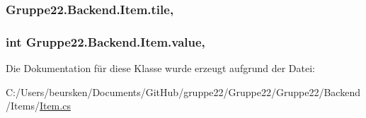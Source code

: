 \hypertarget{class_gruppe22_1_1_backend_1_1_item_ad982ec382c07e05bf4cd77c4643fc076}{
\subsubsection[{tile}]{ Gruppe22.\-Backend.\-Item.\-tile\hspace{0.3cm}{\ttfamily [get]}, {\ttfamily [set]}}}\label{class_gruppe22_1_1_backend_1_1_item_ad982ec382c07e05bf4cd77c4643fc076}
\hypertarget{class_gruppe22_1_1_backend_1_1_item_a738eaf9f7acc989f8885f4973aab6804}{
\subsubsection[{value}]{\setlength{\rightskip}{0pt plus 5cm}int Gruppe22.\-Backend.\-Item.\-value\hspace{0.3cm}{\ttfamily [get]}, {\ttfamily [set]}}}\label{class_gruppe22_1_1_backend_1_1_item_a738eaf9f7acc989f8885f4973aab6804}


Die Dokumentation für diese Klasse wurde erzeugt aufgrund der Datei\-:\begin{DoxyCompactItemize}
\item 
C\-:/\-Users/beursken/\-Documents/\-Git\-Hub/gruppe22/\-Gruppe22/\-Gruppe22/\-Backend/\-Items/\hyperlink{_item_8cs}{Item.\-cs}\end{DoxyCompactItemize}

